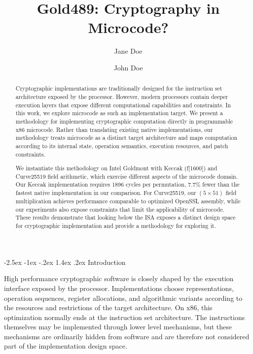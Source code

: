 \documentclass[journal=tches,submission]{iacrtrans}
\author{Jane Doe\inst{1,2} \and John Doe\inst{1}}
\institute{
  Institute A, City, Country, \email{jane@institute}
  \and
  Institute B, City, Country, \email{john@institute}
}
\title{Gold489: Cryptography in Microcode?}
\makeatletter
\renewcommand\section{\@startsection{section}{1}{\z@}%
      {-2.5ex \@plus -1ex \@minus -.2ex}%
      {1.4ex \@plus .2ex}%
      {\normalfont\Large\bfseries\SS@sectfont}}
\makeatother
\begin{document}
\maketitle




\begin{abstract}
Cryptographic implementations are traditionally designed for the instruction set architecture exposed by the processor. 
However, modern processors contain deeper execution layers that expose different computational capabilities and constraints. 
In this work, we explore microcode as such an implementation target. 
We present a methodology for implementing cryptographic computation directly in programmable x86 microcode. 
Rather than translating existing native implementations, our methodology treats microcode as a distinct target architecture and maps computation according to its internal state, operation semantics, execution resources, and patch constraints.

We instantiate this methodology on Intel Goldmont with Keccak (f[1600]) and Curve25519 field arithmetic, which exercise different aspects of the microcode domain. 
Our Keccak implementation requires 1896 cycles per permutation, 7.7\% fewer than the fastest native implementation in our comparison. 
For Curve25519, our $(5\times51)$ field multiplication achieves performance comparable to optimized OpenSSL assembly, while our experiments also expose constraints that limit the applicability of microcode. 
These results demonstrate that looking below the ISA exposes a distinct design space for cryptographic implementation and provide a methodology for exploring it.
\end{abstract}


\section{Introduction}

High performance cryptographic software is closely shaped by the execution interface exposed by the processor.
Implementations choose representations, operation sequences, register allocations, and algorithmic variants according to the resources and restrictions of the target architecture.
On x86, this optimization normally ends at the instruction set architecture.
The instructions themselves may be implemented through lower level mechanisms, but these mechanisms are ordinarily hidden from software and are therefore not considered part of the implementation design space.
\end{document}
